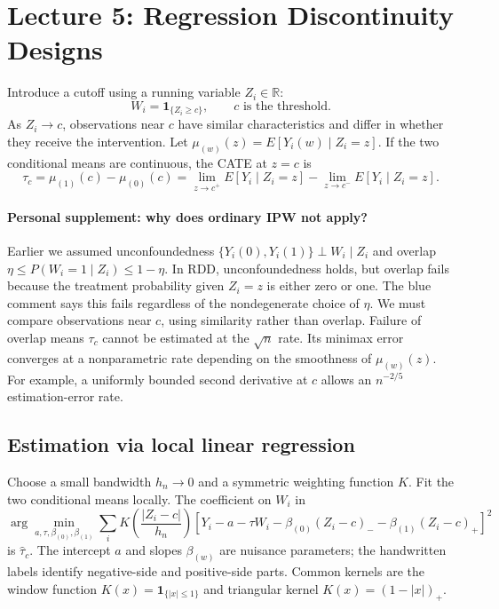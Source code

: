\section{Lecture 5: Regression Discontinuity Designs}
Introduce a cutoff using a running variable $Z_i\in\mathbb R$:
\[
W_i=\mathbf1_{\{Z_i\geq c\}},\qquad c\text{ is the threshold.}
\]
As $Z_i\to c$, observations near $c$ have similar characteristics and differ in whether they receive the intervention. Let $\mu_{(w)}(z)=E[Y_i(w)\mid Z_i=z]$. If the two conditional means are continuous, the CATE at $z=c$ is
\[
\tau_c=\mu_{(1)}(c)-\mu_{(0)}(c)
=\lim_{z\to c^+}E[Y_i\mid Z_i=z]-\lim_{z\to c^-}E[Y_i\mid Z_i=z].
\]
\paragraph{Personal supplement: why does ordinary IPW not apply?}
Earlier we assumed unconfoundedness $\{Y_i(0),Y_i(1)\}\perp W_i\mid Z_i$ and overlap
$\eta\leq P(W_i=1\mid Z_i)\leq1-\eta$. In RDD, unconfoundedness holds, but overlap fails because the treatment probability given $Z_i=z$ is either zero or one. The blue comment says this fails regardless of the nondegenerate choice of $\eta$. We must compare observations near $c$, using similarity rather than overlap.
Failure of overlap means $\tau_c$ cannot be estimated at the $\sqrt n$ rate. Its minimax error converges at a nonparametric rate depending on the smoothness of $\mu_{(w)}(z)$. For example, a uniformly bounded second derivative at $c$ allows an $n^{-2/5}$ estimation-error rate.
\subsection{Estimation via local linear regression}
Choose a small bandwidth $h_n\to0$ and a symmetric weighting function $K$. Fit the two conditional means locally. The coefficient on $W_i$ in
\[
\arg\min_{a,\tau,\beta_{(0)},\beta_{(1)}}\sum_i
K\left(\frac{|Z_i-c|}{h_n}\right)
[Y_i-a-\tau W_i-\beta_{(0)}(Z_i-c)_--\beta_{(1)}(Z_i-c)_+]^2
\]
is $\widehat\tau_c$. The intercept $a$ and slopes $\beta_{(w)}$ are nuisance parameters; the handwritten labels identify negative-side and positive-side parts. Common kernels are the window function $K(x)=\mathbf1_{\{|x|\leq1\}}$ and triangular kernel $K(x)=(1-|x|)_+$.
